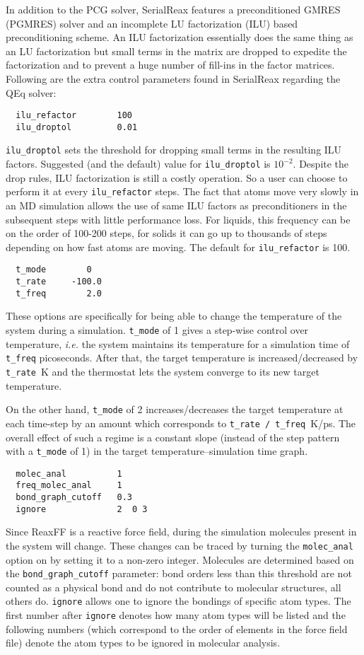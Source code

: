 \documentclass{article}
\begin{document}
In addition to the PCG solver, SerialReax features a preconditioned GMRES 
(PGMRES) solver and an incomplete LU factorization (ILU) based  
preconditioning scheme. An ILU factorization essentially does the 
same thing as an LU factorization but small terms in the matrix are dropped
to expedite the factorization and to prevent a huge number of fill-ins in the
factor matrices. Following are the extra control parameters found in 
SerialReax regarding the QEq solver:
\begin{verbatim}
  ilu_refactor        100
  ilu_droptol         0.01
\end{verbatim}
{\tt ilu\_droptol} sets the threshold for dropping small terms in the 
resulting ILU factors. Suggested (and the default) value for 
{\tt ilu\_droptol} is $10^{-2}$. Despite the drop rules, ILU factorization 
is still a costly operation. So a user can choose to perform it at 
every {\tt ilu\_refactor} steps. The fact that atoms move very slowly in an 
MD simulation allows the use of same ILU factors as preconditioners in the 
subsequent steps with little performance loss. For liquids, this frequency 
can be on the order of 100-200 steps, for solids it can go up to thousands 
of steps depending on how fast atoms are moving. The default for 
{\tt ilu\_refactor} is 100.

\begin{verbatim}
  t_mode        0
  t_rate     -100.0
  t_freq        2.0
\end{verbatim}
These options  are specifically for being able to change the temperature of 
the system during a simulation. {\tt t\_mode} of 1 gives a step-wise 
control over temperature, \emph{i.e.} the system maintains its temperature
for a simulation time of {\tt t\_freq} picoseconds. After that, the 
target temperature is increased/decreased by {\tt t\_rate}~K and the 
thermostat lets the system converge to its new target temperature.

On the other hand, {\tt t\_mode} of 2 increases/decreases the target 
temperature at each time-step by an amount which corresponds to 
{\tt t\_rate / t\_freq}~K/ps. The overall effect of such a regime is a 
constant slope (instead of the step pattern with a {\tt t\_mode} of 1) 
in the target temperature--simulation time graph.

\begin{verbatim}
  molec_anal          1
  freq_molec_anal     1
  bond_graph_cutoff   0.3
  ignore              2  0 3
\end{verbatim}
Since ReaxFF is a reactive force field, during the simulation molecules 
present in the system will change. These changes can  be traced by turning 
the {\tt molec\_anal} option on by setting it to a non-zero integer. 
Molecules are determined based on the {\tt bond\_graph\_cutoff} parameter: 
bond orders less than this threshold are not counted as a physical
bond and do not contribute to molecular structures, all others do. 
{\tt ignore} allows one to ignore the bondings of specific atom types. 
The first number after {\tt ignore} denotes how many atom types will be 
listed and the following numbers (which correspond to the order of 
elements in the force field file) denote the atom types to be ignored 
in molecular analysis.
\end{document}
